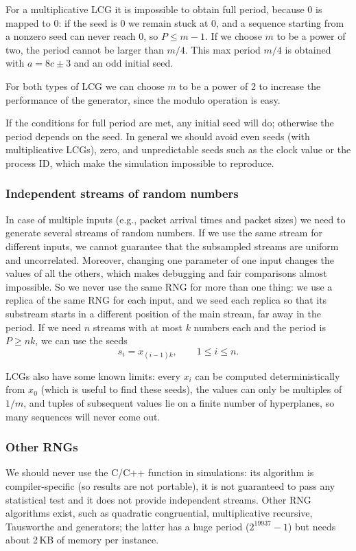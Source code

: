 For a multiplicative LCG it is impossible to obtain full period, because $0$ is mapped to $0$: if the seed is $0$ we remain stuck at $0$, and a sequence starting from a nonzero seed can never reach $0$, so $P \le m - 1$. If we choose $m$ to be a power of two, the period cannot be larger than $m/4$. This max period $m/4$ is obtained with $a = 8c \pm 3$ and an odd initial seed.

For both types of LCG we can choose $m$ to be a power of 2 to increase the performance of the generator, since the modulo operation is easy.

If the conditions for full period are met, any initial seed will do; otherwise the period depends on the seed. In general we should avoid even seeds (with multiplicative LCGs), zero, and unpredictable seeds such as the clock value or the process ID, which make the simulation impossible to reproduce.

\subsubsection{Independent streams of random numbers}
In case of multiple inputs (e.g., packet arrival times and packet sizes) we need to generate several streams of random numbers. If we use the same stream for different inputs, we cannot guarantee that the subsampled streams are uniform and uncorrelated. Moreover, changing one parameter of one input changes the values of all the others, which makes debugging and fair comparisons almost impossible. So we never use the same RNG for more than one thing: we use a replica of the same RNG for each input, and we seed each replica so that its substream starts in a different position of the main stream, far away in the period. If we need $n$ streams with at most $k$ numbers each and the period is $P \ge nk$, we can use the seeds
\[
s_i = x_{(i-1)k}, \qquad 1 \le i \le n.
\]

LCGs also have some known limits: every $x_i$ can be computed deterministically from $x_0$ (which is useful to find these seeds), the values can only be multiples of $1/m$, and tuples of subsequent values lie on a finite number of hyperplanes, so many sequences will never come out.

\subsubsection{Other RNGs}
We should never use the C/C++  function in simulations: its algorithm is compiler-specific (so results are not portable), it is not guaranteed to pass any statistical test and it does not provide independent streams. Other RNG algorithms exist, such as quadratic congruential, multiplicative recursive, Tausworthe and  generators; the latter has a huge period ($2^{19937} - 1$) but needs about 2\,KB of memory per instance.

